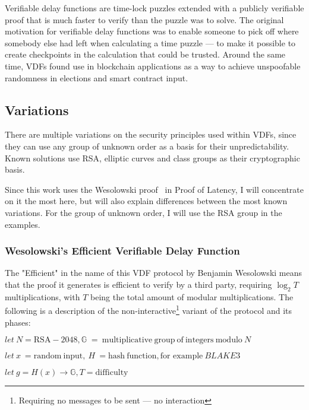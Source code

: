 Verifiable delay functions are time-lock puzzles extended with a publicly verifiable proof that is much faster to verify than the puzzle was to solve. The original motivation for verifiable delay functions was to enable someone to pick off where somebody else had left when calculating a time puzzle --- to make it possible to create checkpoints in the calculation that could be trusted. Around the same time, VDFs found use in blockchain applications as a way to achieve unspoofable randomness in elections and smart contract input.

\subsection{Variations}
There are multiple variations on the security principles used within VDFs, since they can use any group of unknown order as a basis for their unpredictability. Known solutions use RSA, elliptic curves and class groups as their cryptographic basis.

Since this work uses the Wesolowski proof~\cite{Wesolowski2019-ro} in Proof of Latency, I will concentrate on it the most here, but will also explain differences between the most known variations. For the group of unknown order, I will use the RSA group in the examples.

\subsubsection{Wesolowski's Efficient Verifiable Delay Function}
The "Efficient" in the name of this VDF protocol by Benjamin Wesolowski means that the proof it generates is efficient to verify by a third party, requiring \( \log _{2} T \) multiplications, with \( T \) being the total amount of modular multiplications. The following is a description of the non-interactive\footnote{Requiring no messages to be sent --- no interaction} variant of the protocol and its phases:

\( let \: N = \mathrm{RSA-2048}, \mathbb{G} \; = \: \mathrm{multiplicative} \: \mathrm{group} \: \mathrm{of} \: \mathrm{integers} \: \mathrm{modulo} \: N \)

\( let \: x \: = \mathrm{random} \: \mathrm{input},  \: H \: = \mathrm{hash} \: \mathrm{function}, \text{for example} \: BLAKE3 \)

\( let \: g = H(x) \to \mathbb{G}, T = \mathrm{difficulty} \)

